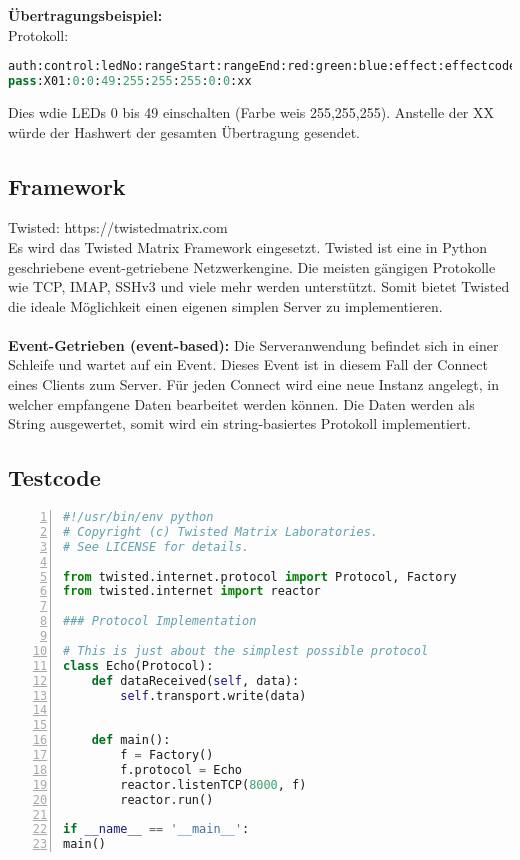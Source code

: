 \textbf{Übertragungsbeispiel:}\\
		Protokoll: 	
\begin{lstlisting}[caption = Beispielübertragung des Protokolls, language=python, frame=single, breaklines=true,columns=fullflexible, commentstyle=\color{gray}\upshape, captionpos=b]
auth:control:ledNo:rangeStart:rangeEnd:red:green:blue:effect:effectcode:hash
pass:X01:0:0:49:255:255:255:0:0:xx
\end{lstlisting}
Dies w die LEDs 0 bis 49 einschalten (Farbe weis 255,255,255). Anstelle der XX würde der Hashwert der gesamten Übertragung gesendet. 
\subsection{Framework}
Twisted: https://twistedmatrix.com \\
Es wird das Twisted Matrix Framework eingesetzt. Twisted ist eine in Python geschriebene  event-getriebene Netzwerkengine. Die meisten gängigen Protokolle wie TCP, IMAP, SSHv3 und viele mehr werden unterstützt. Somit bietet Twisted die ideale Möglichkeit einen eigenen simplen Server zu implementieren. \\\\
\textbf{Event-Getrieben (event-based):} Die Serveranwendung befindet sich in einer Schleife und wartet auf ein Event. Dieses Event ist in diesem Fall der Connect eines Clients zum Server. Für jeden Connect wird eine neue Instanz angelegt, in welcher empfangene Daten bearbeitet werden können. Die Daten werden als String ausgewertet, somit wird ein string-basiertes Protokoll implementiert. \cite{eventbased}

\subsection{Testcode}
\begin{lstlisting}[caption =Testcode Echoserver mit Twisted Framework, language=python, frame=single, breaklines=true,columns=fullflexible, commentstyle=\color{gray}\upshape, captionpos=b, numbers = left]
#!/usr/bin/env python
# Copyright (c) Twisted Matrix Laboratories.
# See LICENSE for details.

from twisted.internet.protocol import Protocol, Factory
from twisted.internet import reactor

### Protocol Implementation

# This is just about the simplest possible protocol
class Echo(Protocol):
	def dataReceived(self, data):
		self.transport.write(data)


	def main():
		f = Factory()
		f.protocol = Echo
		reactor.listenTCP(8000, f)
		reactor.run()

if __name__ == '__main__':
main()
\end{lstlisting}

